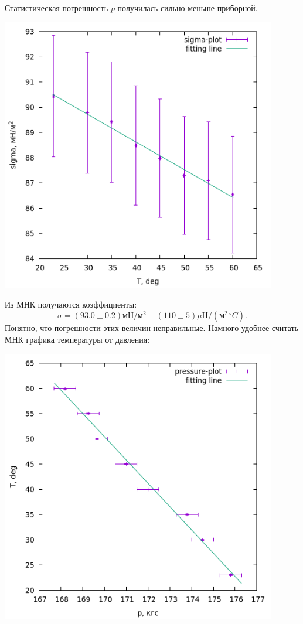 Статистическая погрешность $p$ получилась сильно меньше приборной.
\begin{center}
\includegraphics[width=0.90\textwidth]{plot0.png}
\end{center}
Из МНК получаются коэффициенты:
$$\sigma = (93.0\pm0.2) \text{мН}/\text{м}^2 - (110 \pm 5) \text{$\mu$Н}/(\text{м}^2\,^\circ C).$$
Понятно, что погрешности этих величин неправильные. Намного удобнее считать МНК графика температуры от давления:
\begin{center}
\includegraphics[width=0.90\textwidth]{plot1.png}
\end{center}
